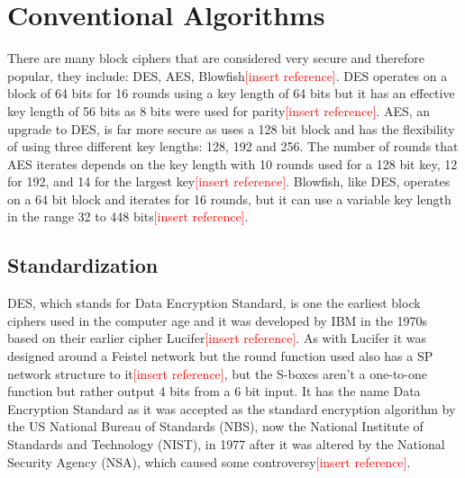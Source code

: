 \documentclass[12pt,twoside,a4paper]{report}
\begin{document}
    \section{Conventional Algorithms}
    There are many block ciphers that are considered very secure and therefore popular, they include: DES, AES, Blowfish\textcolor{red}{[insert reference]}. DES operates on a block of 64 bits for 16 rounds using a key length of 64 bits but it has an effective key length of 56 bits as 8 bits were used for parity\textcolor{red}{[insert reference]}. AES, an upgrade to DES, is far more secure as uses a 128 bit block and has the flexibility of using three different key lengths: 128, 192 and 256. The number of rounds that AES iterates depends on the key length with 10 rounds used for a 128 bit key, 12 for 192, and 14 for the largest key\textcolor{red}{[insert reference]}. Blowfish, like DES, operates on a 64 bit block and iterates for 16 rounds, but it can use a variable key length in the range 32 to 448 bits\textcolor{red}{[insert reference]}.
    
    \subsection{Standardization}
    DES, which stands for Data Encryption Standard, is one the earliest block ciphers used in the computer age and it was developed by IBM in the 1970s based on their earlier cipher Lucifer\textcolor{red}{[insert reference]}. As with Lucifer it was designed around a Feistel network but the round function used also has a SP network structure to it\textcolor{red}{[insert reference]}, but the S-boxes aren't a one-to-one function but rather output 4 bits from a 6 bit input. It has the name Data Encryption Standard as it was accepted as the standard encryption algorithm by the US National Bureau of Standards (NBS), now the National Institute of Standards and Technology (NIST), in 1977 after it was altered by the National Security Agency (NSA), which caused some controversy\textcolor{red}{[insert reference]}.
    
    
\end{document}
